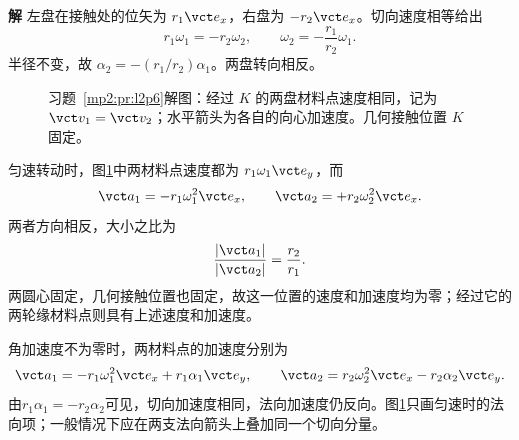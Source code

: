 \documentclass[11pt,openany,fontset=fandol]{ctexbook}
\theoremstyle{definition}\newtheorem{example}{例}[chapter]\newtheorem{exercise}{习题}[chapter]
\newcommand{\SolutionStart}{\par\medskip\ifdim\pagetotal>0pt\ifdim\dimexpr\pagegoal-\pagetotal\relax<3\baselineskip\newpage\fi\fi\noindent\textbf{解}\quad\ignorespaces}
\newenvironment{solution}{\SolutionStart}{\par\medskip}
\begin{document}
\begin{solution}
左盘在接触处的位矢为 $r_1\vct e_x$，右盘为 $-r_2\vct e_x$。切向速度相等给出
\[
r_1\omega_1=-r_2\omega_2,
\qquad \omega_2=-\frac{r_1}{r_2}\omega_1.
\]
半径不变，故 $\alpha_2=-(r_1/r_2)\alpha_1$。两盘转向相反。

\begin{figure}[H]\centering
{}
\caption{习题~\ref{mp2:pr:l2p6}解图：经过 $K$ 的两盘材料点速度相同，记为 $\vct v_1=\vct v_2$；水平箭头为各自的向心加速度。几何接触位置 $K$ 固定。}\label{mp2:fig:l2p6-s}
\end{figure}

匀速转动时，图\ref{mp2:fig:l2p6-s}中两材料点速度都为 $r_1\omega_1\vct e_y$，而
\[
\vct a_1=-r_1\omega_1^2\vct e_x,
\qquad \vct a_2=+r_2\omega_2^2\vct e_x.
\]
两者方向相反，大小之比为
\[
\frac{|\vct a_1|}{|\vct a_2|}=\frac{r_2}{r_1}.
\]
两圆心固定，几何接触位置也固定，故这一位置的速度和加速度均为零；经过它的两轮缘材料点则具有上述速度和加速度。

角加速度不为零时，两材料点的加速度分别为
\[
 \vct a_1=-r_1\omega_1^2\vct e_x+r_1\alpha_1\vct e_y,
 \qquad
 \vct a_2=r_2\omega_2^2\vct e_x-r_2\alpha_2\vct e_y.
\]
由$r_1\alpha_1=-r_2\alpha_2$可见，切向加速度相同，法向加速度仍反向。图\ref{mp2:fig:l2p6-s}只画匀速时的法向项；一般情况下应在两支法向箭头上叠加同一个切向分量。
\end{solution}
\end{document}
